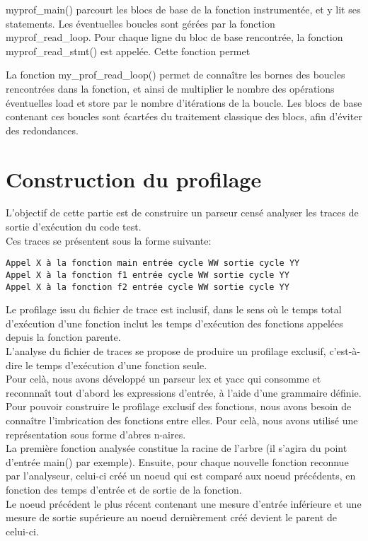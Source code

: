\documentclass[oneside,11pt]{article}
\begin{document}
myprof\_main() parcourt les blocs de base de la fonction instrumentée, et y lit ses statements. Les éventuelles boucles sont gérées par la fonction myprof\_read\_loop.
Pour chaque ligne du bloc de base rencontrée, la fonction myprof\_read\_stmt() est appelée. Cette fonction permet 

La fonction my\_prof\_read\_loop() permet de connaître les bornes des boucles rencontrées dans la fonction, et ainsi de multiplier le nombre des opérations éventuelles load et store par le nombre d'itérations de la boucle. Les blocs de base contenant ces boucles sont écartées du traitement classique des blocs, afin d'éviter des redondances.

\section{Construction du profilage}

L'objectif de cette partie est de construire un parseur censé analyser les traces de sortie d'exécution du code test.\\

Ces traces se présentent sous la forme suivante:
\begin{verbatim}
Appel X à la fonction main entrée cycle WW sortie cycle YY
Appel X à la fonction f1 entrée cycle WW sortie cycle YY
Appel X à la fonction f2 entrée cycle WW sortie cycle YY
\end{verbatim}

Le profilage issu du fichier de trace est inclusif, dans le sens où le temps total d'exécution d'une fonction inclut les temps d'exécution des fonctions appelées depuis la fonction parente.\\
L'analyse du fichier de traces se propose de produire un profilage exclusif, c'est-à-dire le temps d'exécution d'une fonction seule.\\
Pour celà, nous avons développé un parseur lex et yacc qui consomme et reconnnaît tout d'abord les expressions d'entrée, à l'aide d'une grammaire définie.\\

Pour pouvoir construire le profilage exclusif des fonctions, nous avons besoin de connaître l'imbrication des fonctions entre elles.
Pour celà, nous avons utilisé une représentation sous forme d'abres n-aires.\\
La première fonction analysée constitue la racine de l'arbre (il s'agira du point d'entrée main() par exemple). Ensuite, pour chaque nouvelle fonction reconnue par l'analyseur, celui-ci créé un noeud qui est comparé aux noeud précédents, en fonction des temps d'entrée et de sortie de la fonction.\\
Le noeud précédent le plus récent contenant une mesure d'entrée inférieure et une mesure de sortie supérieure au noeud dernièrement créé devient le parent de celui-ci.\\
\end{document}
